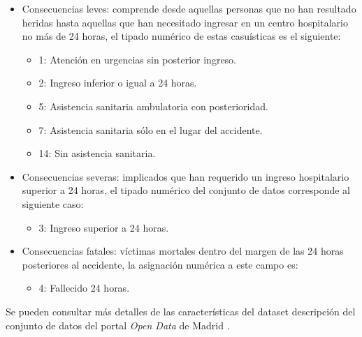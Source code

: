               \begin{itemize}
                    \item Consecuencias leves: comprende desde aquellas personas que no han resultado heridas hasta aquellas que han necesitado ingresar en un centro hospitalario no más de 24 horas, el tipado numérico de estas casuísticas es el siguiente:

                        \begin{itemize}
                            \item 1: Atención en urgencias sin posterior ingreso.
                            \item 2: Ingreso inferior o igual a 24 horas.
                            \item 5: Asistencia sanitaria ambulatoria con posterioridad.
                            \item 7: Asistencia sanitaria sólo en el lugar del accidente.
                            \item 14: Sin asistencia sanitaria.
                        \end{itemize}

                    \item Consecuencias severas: implicados que han requerido un ingreso hospitalario superior a 24 horas, el tipado numérico del conjunto de datos corresponde al siguiente caso:

                        \begin{itemize}
                            \item 3: Ingreso superior a 24 horas.
                        \end{itemize}

                    \item Consecuencias fatales: víctimas mortales dentro del margen de las 24 horas posteriores al accidente, la asignación numérica a este campo es:

                        \begin{itemize}
                            \item 4: Fallecido 24 horas.
                        \end{itemize}

                \end{itemize}


            Se pueden consultar más detalles de las características del dataset descripción del conjunto de datos del portal \textit{Open Data} de Madrid \cite{InfoDatasetMadrid}.


